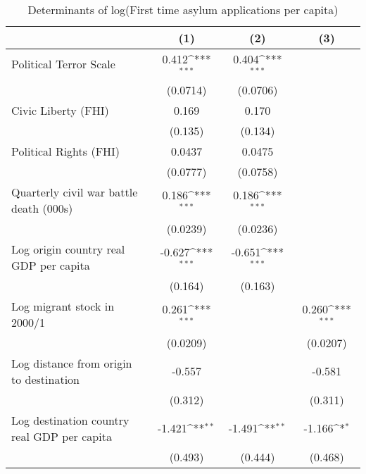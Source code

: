 \begin{table}[htbp]\centering
\def\sym#1{\ifmmode^{#1}\else\(^{#1}\)\fi}
\caption{Determinants of log(First time asylum applications per capita)}
\begin{tabular}{l*{3}{c}}
\hline\hline
                    &\multicolumn{1}{c}{(1)}         &\multicolumn{1}{c}{(2)}         &\multicolumn{1}{c}{(3)}         \\
\hline
Political Terror Scale&       0.412\sym{***}&       0.404\sym{***}&                     \\
                    &    (0.0714)         &    (0.0706)         &                     \\
[1em]
Civic Liberty (FHI) &       0.169         &       0.170         &                     \\
                    &     (0.135)         &     (0.134)         &                     \\
[1em]
Political Rights (FHI)&      0.0437         &      0.0475         &                     \\
                    &    (0.0777)         &    (0.0758)         &                     \\
[1em]
Quarterly civil war battle death (000s)&       0.186\sym{***}&       0.186\sym{***}&                     \\
                    &    (0.0239)         &    (0.0236)         &                     \\
[1em]
Log origin country real GDP per capita&      -0.627\sym{***}&      -0.651\sym{***}&                     \\
                    &     (0.164)         &     (0.163)         &                     \\
[1em]
Log migrant stock in 2000/1&       0.261\sym{***}&                     &       0.260\sym{***}\\
                    &    (0.0209)         &                     &    (0.0207)         \\
[1em]
Log distance from origin to destination&      -0.557         &                     &      -0.581         \\
                    &     (0.312)         &                     &     (0.311)         \\
[1em]
Log destination country real GDP per capita&      -1.421\sym{**} &      -1.491\sym{**} &      -1.166\sym{*}  \\
                    &     (0.493)         &     (0.444)         &     (0.468)         \\

\end{tabular}
\end{table}

